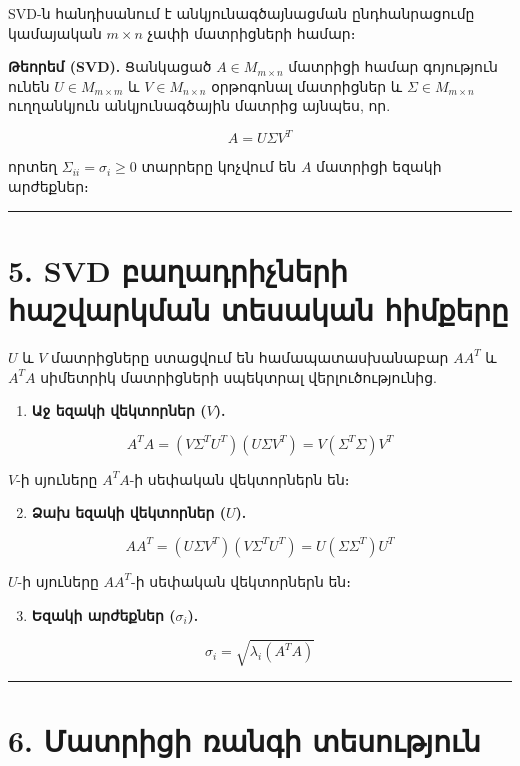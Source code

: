 \documentclass[12pt, a4paper]{article}
\begin{document}
SVD-ն հանդիսանում է անկյունագծայնացման ընդհանրացումը կամայական $m \times n$ չափի մատրիցների համար։

\textbf{Թեորեմ (SVD).} Ցանկացած $A \in M_{m \times n}$ մատրիցի համար գոյություն ունեն $U \in M_{m \times m}$ և $V \in M_{n \times n}$ օրթոգոնալ մատրիցներ և $\Sigma \in M_{m \times n}$ ուղղանկյուն անկյունագծային մատրից այնպես, որ.

$$
A = U \Sigma V^T
$$

որտեղ $\Sigma_{ii} = \sigma_i \ge 0$ տարրերը կոչվում են $A$ մատրիցի եզակի արժեքներ։

\vspace{1em}
\hrule
\vspace{1em}

\section{5. SVD բաղադրիչների հաշվարկման տեսական հիմքերը}

$U$ և $V$ մատրիցները ստացվում են համապատասխանաբար $A A^T$ և $A^T A$ սիմետրիկ մատրիցների սպեկտրալ վերլուծությունից.

\begin{enumerate}
    \item \textbf{Աջ եզակի վեկտորներ ($V$).}
\end{enumerate}

$$
A^T A = (V \Sigma^T U^T)(U \Sigma V^T) = V (\Sigma^T \Sigma) V^T
$$

$V$-ի սյուները $A^T A$-ի սեփական վեկտորներն են։

\begin{enumerate}
    \setcounter{enumi}{1}
    \item \textbf{Ձախ եզակի վեկտորներ ($U$).}
\end{enumerate}

$$
A A^T = (U \Sigma V^T)(V \Sigma^T U^T) = U (\Sigma \Sigma^T) U^T
$$

$U$-ի սյուները $A A^T$-ի սեփական վեկտորներն են։

\begin{enumerate}
    \setcounter{enumi}{2}
    \item \textbf{Եզակի արժեքներ ($\sigma_i$).}
\end{enumerate}

$$
\sigma_i = \sqrt{\lambda_i(A^T A)}
$$

\vspace{1em}
\hrule
\vspace{1em}

\section{6. Մատրիցի ռանգի տեսություն}
\end{document}
